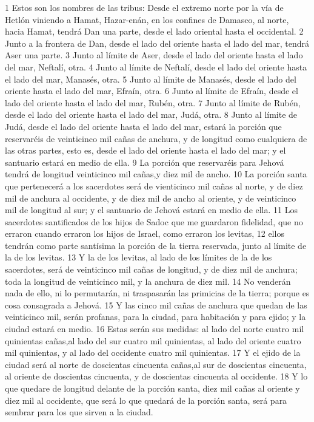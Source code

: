 1 Estos son los nombres de las tribus: Desde el extremo norte por la vía de Hetlón viniendo a Hamat, Hazar-enán, en los confines de Damasco, al norte, hacia Hamat, tendrá Dan una parte, desde el lado oriental hasta el occidental.
2 Junto a la frontera de Dan, desde el lado del oriente hasta el lado del mar, tendrá Aser una parte.
3 Junto al límite de Aser, desde el lado del oriente hasta el lado del mar, Neftalí, otra.
4 Junto al límite de Neftalí, desde el lado del oriente hasta el lado del mar, Manasés, otra.
5 Junto al límite de Manasés, desde el lado del oriente hasta el lado del mar, Efraín, otra.
6 Junto al límite de Efraín, desde el lado del oriente hasta el lado del mar, Rubén, otra.
7 Junto al límite de Rubén, desde el lado del oriente hasta el lado del mar, Judá, otra.
8 Junto al límite de Judá, desde el lado del oriente hasta el lado del mar, estará la porción que reservaréis de veinticinco mil cañas de anchura, y de longitud como cualquiera de las otras partes, esto es, desde el lado del oriente hasta el lado del mar; y el santuario estará en medio de ella.
9 La porción que reservaréis para Jehová tendrá de longitud veinticinco mil cañas,y diez mil de ancho.
10 La porción santa que pertenecerá a los sacerdotes será de vienticinco mil cañas al norte, y de diez mil de anchura al occidente, y de diez mil de ancho al oriente, y de veinticinco mil de longitud al sur; y el santuario de Jehová estará en medio de ella.
11 Los sacerdotes santificados de los hijos de Sadoc que me guardaron fidelidad, que no erraron cuando erraron los hijos de Israel, como erraron los levitas,
12 ellos tendrán como parte santísima la porción de la tierra reservada, junto al límite de la de los levitas.
13 Y la de los levitas, al lado de los límites de la de los sacerdotes, será de veinticinco mil cañas de longitud, y de diez mil de anchura; toda la longitud de veinticinco mil, y la anchura de diez mil.
14 No venderán nada de ello, ni lo permutarán, ni traspasarán las primicias de la tierra; porque es cosa consagrada a Jehová.
15 Y las cinco mil cañas de anchura que quedan de las veinticinco mil, serán profanas, para la ciudad, para habitación y para ejido; y la ciudad estará en medio.
16 Estas serán sus medidas: al lado del norte cuatro mil quinientas cañas,al lado del sur cuatro mil quinientas, al lado del oriente cuatro mil quinientas, y al lado del occidente cuatro mil quinientas.
17 Y el ejido de la ciudad será al norte de doscientas cincuenta cañas,al sur de doscientas cincuenta, al oriente de doscientas cincuenta, y de doscientas cincuenta al occidente. 
18 Y lo que quedare de longitud delante de la porción santa, diez mil cañas al oriente y diez mil al occidente, que será lo que quedará de la porción santa, será para sembrar para los que sirven a la ciudad.
